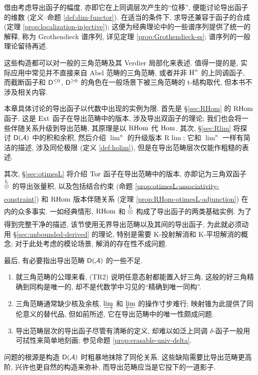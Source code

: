 借由考虑导出函子的幅度, 亦即它在上同调层次产生的``位移'', 便能讨论导出函子的维数 (定义--命题 \ref{def:dim-functor}). 在适当的条件下, 求导还兼容于函子的合成 (定理 \ref{prop:localization-injective}); 这便为经典理论中的一些谱序列提供了统一的解释, 称为 Grothendieck 谱序列, 详见定理 \ref{prop:Grothendieck-ss}; 谱序列的一般理论留待再述.

这些构造都可以对一般的三角范畴及其 Verdier 局部化来表述. 值得一提的是, 实际应用中常见并不直接来自 Abel 范畴的三角范畴, 或者并非 $\operatorname{H}^n$ 的上同调函子, 而截断函子和 $\mathsf{D}^{\leq 0}$, $\mathsf{D}^{\geq 0}$ 的角色在一般场景下被三角范畴的 t-结构取代, 但本书不涉及相关内容.

本章具体讨论的导出函子以代数中出现的实例为限. 首先是 \S\ref{sec:RHom} 的 $\operatorname{RHom}$ 函子. 这是 $\operatorname{Ext}$ 函子在导出范畴中的版本, 涉及导出双函子的理论; 我们也会将一些伴随关系升级到导出范畴, 其原理是以 $\operatorname{RHom}$ 代 $\operatorname{Hom}$. 其次, \S\ref{sec:Rlim} 将探讨 $\mathsf{D}(\mathcal{A})$ 中的积和余积, 然后介绍 $\lim^n$ 的升级版本 $\mathrm{R}\lim$; 它和 $\lim^n$ 一样有简洁的描述, 涉及同伦极限 (定义 \ref{def:holim}), 但是在导出范畴层次仅能作粗糙的表述.

其次, \S\ref{sec:otimesL} 将介绍 $\operatorname{Tor}$ 函子在导出范畴中的版本, 亦即记为三角双函子 $\underset{}{\overset{\mathrm{L}}{\otimes}}$ 的导出张量积, 以及包括结合约束 (命题 \ref{prop:otimesL-associativity-constraint}) 和 $\operatorname{RHom}$ 版本伴随关系 (定理 \ref{prop:RHom-otimesL-adjunction}) 在内的众多事实. 一如经典情形, $\operatorname{RHom}$ 和 $\underset{}{\overset{\mathrm{L}}{\otimes}}$ 构成了导出函子的两类基础实例. 为了得到完整干净的描述, 该节使用无界导出范畴以及其间的导出函子, 为此就必须动用 \S\ref{sec:unbounded-derived} 的理论, 特别是需要 K-投射解消和 K-平坦解消的概念; 对于此处考虑的模论场景, 解消的存在性不成问题.

最后, 有必要指出导出范畴 $\mathsf{D}(\mathcal{A})$ 的一些不足.
\begin{enumerate}
	\item 就三角范畴的公理来看, (TR2) 说明任意态射都能置入好三角, 这般的好三角精确到同构是唯一的, 却不是代数学中习见的``精确到唯一同构''.
	\item 三角范畴通常缺少核及余核, $\varinjlim$ 和 $\varprojlim$ 的操作寸步难行; 映射锥为此提供了同伦意义的替代品, 但如前所述, 它在导出范畴中的唯一性颇成问题.
	\item 导出范畴层次的导出函子尽管有清晰的定义, 却难以如泛上同调 $\delta$-函子一般用可拭性来简单地刻画; 参见命题 \ref{prop:erasable-univ-delta}.
\end{enumerate}

问题的根源是构造 $\mathsf{D}(\mathcal{A})$ 时粗暴地抹除了同伦关系. 这些缺陷需要比导出范畴更高阶, 兴许也更自然的构造来弥补, 而导出范畴应当是它投下的一道影子.

